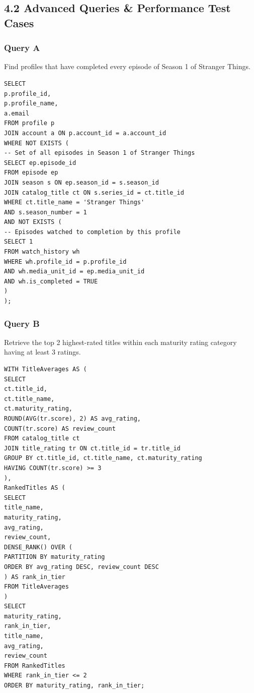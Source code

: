 \subsection*{4.2 Advanced Queries \& Performance Test Cases}

\subsubsection*{Query A}

Find profiles that have completed every episode of Season 1 of \textquotesingle Stranger Things\textquotesingle.

\begin{lstlisting}[style=reportsql,title={SQL}]
SELECT
p.profile_id,
p.profile_name,
a.email
FROM profile p
JOIN account a ON p.account_id = a.account_id
WHERE NOT EXISTS (
-- Set of all episodes in Season 1 of Stranger Things
SELECT ep.episode_id
FROM episode ep
JOIN season s ON ep.season_id = s.season_id
JOIN catalog_title ct ON s.series_id = ct.title_id
WHERE ct.title_name = 'Stranger Things'
AND s.season_number = 1
AND NOT EXISTS (
-- Episodes watched to completion by this profile
SELECT 1
FROM watch_history wh
WHERE wh.profile_id = p.profile_id
AND wh.media_unit_id = ep.media_unit_id
AND wh.is_completed = TRUE
)
);
\end{lstlisting}

\subsubsection*{Query B}

Retrieve the top 2 highest-rated titles within each maturity rating category having at least 3 ratings.

\begin{lstlisting}[style=reportsql,title={SQL}]
WITH TitleAverages AS (
SELECT
ct.title_id,
ct.title_name,
ct.maturity_rating,
ROUND(AVG(tr.score), 2) AS avg_rating,
COUNT(tr.score) AS review_count
FROM catalog_title ct
JOIN title_rating tr ON ct.title_id = tr.title_id
GROUP BY ct.title_id, ct.title_name, ct.maturity_rating
HAVING COUNT(tr.score) >= 3
),
RankedTitles AS (
SELECT
title_name,
maturity_rating,
avg_rating,
review_count,
DENSE_RANK() OVER (
PARTITION BY maturity_rating
ORDER BY avg_rating DESC, review_count DESC
) AS rank_in_tier
FROM TitleAverages
)
SELECT
maturity_rating,
rank_in_tier,
title_name,
avg_rating,
review_count
FROM RankedTitles
WHERE rank_in_tier <= 2
ORDER BY maturity_rating, rank_in_tier;
\end{lstlisting}

